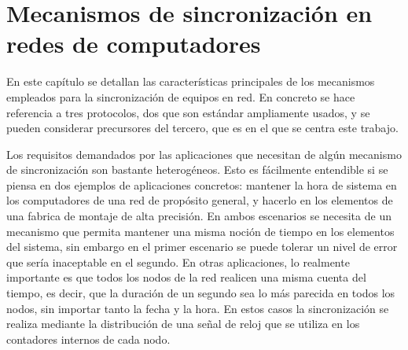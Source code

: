 \chapter{Mecanismos de sincronización en redes de computadores}

En este capítulo se detallan las características principales de los mecanismos 
empleados para la sincronización de equipos en red. En concreto se hace 
referencia a tres protocolos, dos que son estándar ampliamente usados, y se 
pueden considerar precursores del tercero, que es en el que se centra este 
trabajo.

Los requisitos demandados por las aplicaciones que necesitan de algún mecanismo 
de sincronización son bastante heterogéneos. Esto es fácilmente entendible si 
se piensa en dos ejemplos de aplicaciones concretos: mantener la hora de 
sistema en los computadores de una red de propósito general, y hacerlo en los 
elementos de una fabrica de montaje de alta precisión.
En ambos escenarios se necesita de un mecanismo que permita mantener una misma 
noción de tiempo en los elementos del sistema, sin embargo en el primer 
escenario se puede tolerar un nivel de error que sería inaceptable en el 
segundo.
En otras aplicaciones, lo realmente importante es que todos los nodos de la red 
realicen una misma cuenta del tiempo, es decir, que la duración de un segundo 
sea lo más parecida en todos los nodos, sin importar tanto la fecha y la hora. 
En estos casos la sincronización se realiza mediante la distribución de una 
señal de reloj que se utiliza en los contadores internos de cada nodo. 



